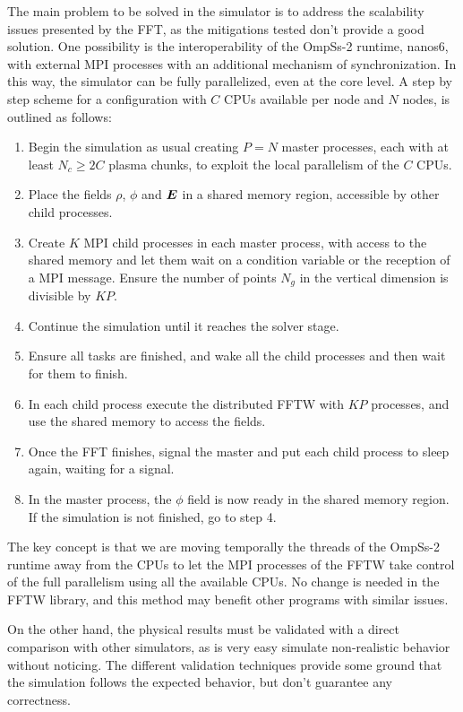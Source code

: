 The main problem to be solved in the simulator is to address the scalability 
issues presented by the FFT, as the mitigations tested don't provide a good 
solution. One possibility is the interoperability of the OmpSs-2 runtime, 
nanos6, with external MPI processes with an additional mechanism of 
synchronization. In this way, the simulator can be fully parallelized, even at 
the core level. A step by step scheme for a configuration with $C$ CPUs 
available per node and $N$ nodes, is outlined as follows:
%
\begin{enumerate}
\item Begin the simulation as usual creating $P=N$ master processes, each with 
at least $N_c \ge 2C$ plasma chunks, to exploit the local parallelism of the $C$ 
CPUs.
\item Place the fields $\rho$, $\phi$ and $\bm{E}$ in a shared memory region, 
accessible by other child processes.
\item Create $K$ MPI child processes in each master process, with access to the 
shared memory and let them wait on a condition variable or the reception of a 
MPI message.  Ensure the number of points $N_g$ in the vertical dimension is 
divisible by $KP$.
\item Continue the simulation until it reaches the solver stage.
\item Ensure all tasks are finished, and wake all the child processes and then 
wait for them to finish.
\item In each child process execute the distributed FFTW with $KP$ processes, 
and use the shared memory to access the fields.
\item Once the FFT finishes, signal the master and put each child process to 
sleep again, waiting for a signal.
\item In the master process, the $\phi$ field is now ready in the shared memory 
region. If the simulation is not finished, go to step 4.
\end{enumerate}
%
The key concept is that we are moving temporally the threads of the OmpSs-2 
runtime away from the CPUs to let the MPI processes of the FFTW take control of 
the full parallelism using all the available CPUs. No change is needed in the 
FFTW library, and this method may benefit other programs with similar issues.

On the other hand, the physical results must be validated with a direct 
comparison with other simulators, as is very easy simulate non-realistic 
behavior without noticing. The different validation techniques provide some 
ground that the simulation follows the expected behavior, but don't guarantee 
any correctness.

